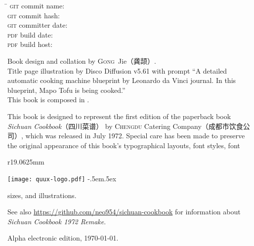 \endgroup

\vfill

\setlength{\parskip}{.3125\baselineskip}%
\vspace{-2\baselineskip}
\begin{tabbing}
\hspace{9.5625em}\= \kill
\textsc{git} commit name:       \>\texttt{\gitcommitname}\\
\textsc{git} commit hash:       \>\texttt{\gitcommithash}\\
\textsc{git} committer date:    \>\texttt{\gitcommitterdate}\\
\textsc{pdf} build date:        \>\texttt{\pdfbuilddate}\\
\textsc{pdf} build host:        \>\texttt{\pdfbuildhost}
\end{tabbing}
\vspace{-1\baselineskip}

Book design and collation by \textsc{Gong}~Jie\!（龚颉）\!\!.\\
Title page illustration by Disco Diffusion v5.61 with prompt ``A detailed
automatic cooking machine blueprint by Leonardo da Vinci journal. In this
blueprint, Mapo Tofu is being cooked.''\\
This book is composed in \XeLaTeX.

This book is designed to represent the first edition of the paperback book
\textit{Sichuan Cookbook}{\kafamily（四川菜谱）}\!\! by \textsc{Chengdu}
Catering Company\!（成都市饮食公司）\!\!, which was released in July 1972.
Special care has been made to preserve the original appearance of this book's
typographical layouts, font styles, font
\begin{wrapfigure}{r}{19.0625mm}%
\vspace{-1.25\baselineskip}%
\begin{flushright}%
\quad\texttt{[image: quux-logo.pdf]}%
{\sffamily\tiny\kern-.5em\lower.5ex\hbox{\texttrademark}}%
\end{flushright}%
\vspace{-1.75\baselineskip}%
\end{wrapfigure}%
sizes, and illustrations.

See also \url{https://github.com/neo954/sichuan-cookbook} for information
about \textit{Sichuan Cookbook 1972 Remake}.

Alpha electronic edition, \today.

\endgroup%


